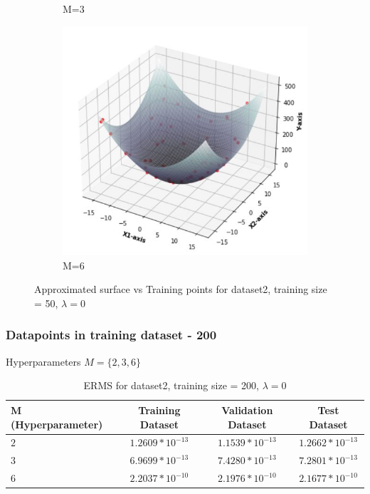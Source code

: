 \documentclass[11pt]{article}
\begin{document}
\begin{figure}[h]
\begin{subfigure}[b]{0.4\textwidth}
	\caption{    M=3}
	\label{fig:fig2.1.1.2}
	\end{subfigure}
	\hfill
	\begin{subfigure}[b]{0.4\textwidth}
	\centering
	\includegraphics[scale=0.5]{dataset2_50_lambda0_m6funcplot.jpg}
	\caption{    M=6}
	\label{fig:fig2.1.1.3}
	\end{subfigure}
\caption{Approximated surface vs Training points for dataset2, training size = 50, $\lambda = 0$}
\label{fig:fig2.1.1}
\end{figure}

\newpage
\subsubsection{Datapoints in training dataset - 200}
Hyperparameters $M = \{2,3,6\}$
\begin{table}[h]
\label{tab:tab2.1.3}
\begin{center}
\begin{tabular}{|l|c|c|c|}
\hline
\textbf{M (Hyperparameter)} & \textbf{Training Dataset} & \textbf{Validation Dataset} &\textbf{Test Dataset}\\
\hline
$2$ & $1.2609*10^{-13}$ & $1.1539*10^{-13}$ & $1.2662*10^{-13}$\\
\hline
$3$ & $6.9699*10^{-13}$ & $7.4280*10^{-13}$ & $7.2801*10^{-13}$\\
\hline
$6$ & $2.2037*10^{-10}$ & $2.1976*10^{-10}$ & $2.1677*10^{-10}$\\
\hline
\end{tabular}
\caption{ERMS for dataset2, training size = 200, $\lambda = 0$}
\end{center}
\end{table}
\end{document}
